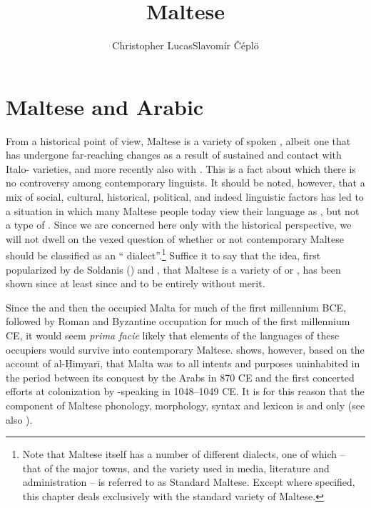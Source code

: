 \documentclass[output=paper]{langsci/langscibook}
\title{Maltese}
\author{Christopher Lucas\affiliation{SOAS University of London}\lastand Slavomír Čéplö\affiliation{Institute of Oriental Studies, Slovak Academy of Sciences/IMAFO Abteilung Byzanzforschung, Österreichische Akademie der Wissenschaften}}
\begin{document}
\maketitle
\section{Maltese and Arabic}\largerpage %
From a historical point of view, Maltese is a variety of spoken , albeit one that has undergone far-reaching changes as a result of sustained and  contact with Italo- varieties, and more recently also with . This is a fact about which there is no controversy among contemporary linguists. It should be noted, however, that a mix of social, cultural, historical, political, and indeed linguistic factors has led to a situation in which many Maltese people today view their language as , but not a type of . Since we are concerned here only with the historical perspective, we will not dwell on the vexed question of whether or not contemporary Maltese should be classified as an `` dialect''.\footnote{Note that Maltese itself has a number of different dialects, one of which -- that of the major towns, and the variety used in media, literature and administration -- is referred to as  Standard Maltese. Except where specified, this chapter deals exclusively with the standard variety of Maltese.} Suffice it to say that the idea, first popularized by de Soldanis (\citeyear{desoldanis1750}) and \cite{vassalli1791}, that Maltese is a variety of  or , has been shown since at least since \cite{gesenius1810} and \cite{desacy1829} to be entirely without merit.

Since the  and then the  occupied Malta for much of the first millennium BCE, followed by Roman and Byzantine occupation for much of the first millennium CE, it would seem \textit{prima facie} likely that elements of the languages of these occupiers would survive into contemporary Maltese. \cite{brincat1995} shows, however, based on the account of al-Ḥimyarī, that Malta was to all intents and purposes uninhabited in the period between its conquest by the Arabs in 870 CE and the first concerted efforts at colonization by -speaking  in 1048--1049 CE. It is for this reason that the  component of Maltese phonology, morphology, syntax and lexicon is  and  only (see also \citealt{grech1961}).
\end{document}
